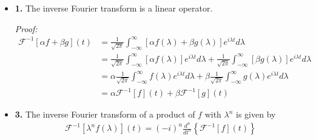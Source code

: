 \begin{questions}

\begin{solution}
\begin{itemize}
\item \textbf{1.} The inverse Fourier transform is a linear operator. 

\textit{Proof:}
\begin{align*}
\mathcal{F}^{-1}[\alpha f+\beta g](t)&=\frac{1}{\sqrt{2\pi}}\int_{-\infty}^{\infty}[\alpha f(\lambda)+\beta g(\lambda)]e^{i\lambda t}d\lambda\\
&=\frac{1}{\sqrt{2\pi}}\int_{-\infty}^{\infty}[\alpha f(\lambda)]e^{i\lambda t}d\lambda+\frac{1}{\sqrt{2\pi}}\int_{-\infty}^{\infty}[\beta g(\lambda)]e^{i\lambda t}d\lambda\\
&=\alpha\frac{1}{\sqrt{2\pi}}\int_{-\infty}^{\infty} f(\lambda)e^{i\lambda t}d\lambda+\beta\frac{1}{\sqrt{2\pi}}\int_{-\infty}^{\infty}g(\lambda)e^{i\lambda t}d\lambda\\
&=\alpha \mathcal{F}^{-1}[f](t)+\beta \mathcal{F}^{-1}[g](t)
\end{align*}
\item \textbf{3.} The inverse Fourier transform of a product of $f$ with $\lambda^n$ is given by
\begin{align*}
\mathcal{F}^{-1}[\lambda^nf(\lambda)](t)=(-i)^n\frac{d^n}{dt^n}\left\lbrace\mathcal{F}^{-1}[f](t)\right\rbrace
\end{align*}


\end{itemize}
\end{solution}
\end{questions}
